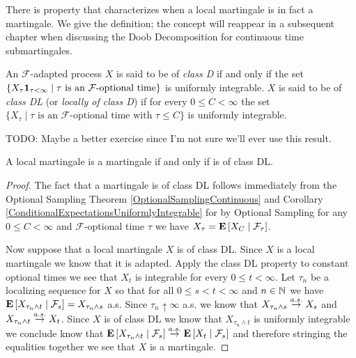 There is property that characterizes when a local martingale is in fact a martingale.  We give the definition; the concept will reappear in a subsequent chapter when discussing the Doob Decomposition for continuous time submartingales. 
\begin{defn}An $\mathcal{F}$-adapted process $X$ is said to be of \emph{class D} if and only if the set $\lbrace X_\tau \characteristic{\tau < \infty} \mid \tau \text{ is an $\mathcal{F}$-optional time}\rbrace$ is uniformly integrable.  $X$ is said to be of \emph{class DL} (or \emph{locally of class D}) if for every $0 \leq C < \infty$ the set
$\lbrace X_\tau \mid \tau \text{ is an $\mathcal{F}$-optional time with }\tau \leq C\rbrace$ is uniformly integrable.
\end{defn}
TODO: Maybe a better exercise since I'm not sure we'll ever use this result.
\begin{prop}A local martingale is a martingale if and only if is of class DL.
\end{prop}
\begin{proof}
The fact that a martingale is of class DL follows immediately from the Optional Sampling Theorem \ref{OptionalSamplingContinuous} and Corollary \ref{ConditionalExpectationsUniformlyIntegrable}  for by Optional Sampling for any $0 \leq C < \infty$ and $\mathcal{F}$-optional time $\tau$ we have $X_\tau = \cexpectationlong{\mathcal{F}_\tau}{X_C}$.  

Now suppose that a local martingale $X$ is of class DL.  Since $X$ is a local martingale we know that it is adapted.  Apply the class DL property to constant optional times we see that $X_t$ is integrable for every $0 \leq t < \infty$.  Let $\tau_n$ be a localizing sequence for $X$ so that for all $0 \leq s < t < \infty$ and $n \in \naturals$ we have $\cexpectationlong{\mathcal{F}_s}{X_{\tau_n \wedge t}} = X_{\tau_n \wedge s}$ a.s.  Since $\tau_n \uparrow \infty$ a.s. we know that $X_{\tau_n \wedge s} \toas X_s$ and $X_{\tau_n \wedge t} \toas X_t$.  Since $X$ is of class DL we know that $X_{\tau_n \wedge t}$ is uniformly integrable we conclude know that $\cexpectationlong{\mathcal{F}_s}{X_{\tau_n \wedge t}} \toas \cexpectationlong{\mathcal{F}_s}{X_{t}}$ and therefore stringing the equalities together we see that $X$ is a martingale.
\end{proof}

